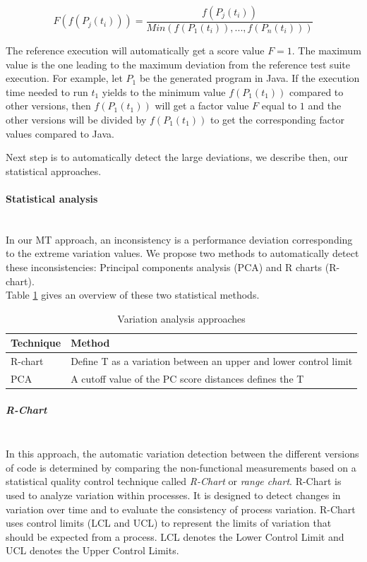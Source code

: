 \begin{equation}
F(f(P_{j}(t_{i})))=\frac{f(P_{j}(t_{i}))}{Min(f(P_{1}(t_{i})),..., f(P_{n}(t_{i})))}  
\end{equation}

The reference execution will automatically get a score value $F = 1$. The maximum value is the one leading to the maximum deviation from the reference test suite execution. For example, let $P_{1}$ be the generated program in Java. If the execution time needed to run $t_{1}$ yields to the minimum value $f(P_{1}(t_{1}))$ compared to other versions, then $f(P_{1}(t_{1}))$ will get a factor value $F$ equal to $1$ and the other versions will be divided by $f(P_{1}(t_{1}))$ to get the corresponding factor values compared to Java.

Next step is to automatically detect the large deviations, we describe then, our statistical approaches.

\paragraph{Statistical analysis}~\\
 
In our MT approach, an inconsistency is a performance deviation corresponding to the extreme variation values.
We propose two methods to automatically detect these inconsistencies: Principal components analysis (PCA) and R charts (R-chart).\\
Table \ref{tab:Statistical methods} gives an overview of these two statistical methods.
\begin{table}[h]
	\centering
	
	\begin{tabular}{| l |l |}				
		\hline
		
		\textbf{Technique} &  \textbf{Method}    \\ \hline
	    R-chart &  Define T as a variation between an upper and lower control limit  \\ \hline
		PCA &  A cutoff value of the PC score distances defines the T \\ \hline
	\end{tabular}
	
	\caption{Variation analysis approaches}
	\label{tab:Statistical methods}
\end{table}

\subparagraph{R-Chart}~\\
In this approach, the automatic variation detection between the different versions of code is determined by comparing the non-functional measurements based on a statistical quality control technique called \textit{R-Chart} or \textit{range chart}\cite{malik2013automatic}. 
R-Chart is used to analyze variation within processes. It is designed to detect changes in variation over time and to evaluate the consistency of process variation.
R-Chart uses control limits (LCL and UCL) to represent the limits of variation that should be expected from a process. LCL denotes the Lower Control Limit and UCL denotes the Upper Control Limits.
 
